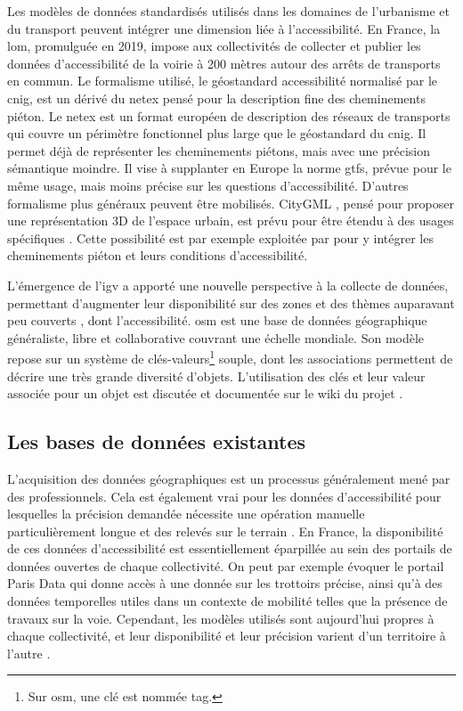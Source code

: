 Les modèles de données standardisés utilisés dans les domaines de l'urbanisme et du transport peuvent intégrer une dimension liée à l'accessibilité. En France, la \gls{lom}, promulguée en 2019, impose aux collectivités de collecter et publier les données d'accessibilité de la voirie à 200 mètres autour des arrêts de transports en commun. Le formalisme utilisé, le géostandard accessibilité normalisé par le \gls{cnig}, est un dérivé du \gls{netex} pensé pour la description fine des cheminements piéton. Le \gls{netex} est un format européen de description des réseaux de transports qui couvre un périmètre fonctionnel plus large que le géostandard du \gls{cnig}. Il permet déjà de représenter les cheminements piétons, mais avec une précision sémantique moindre. Il vise à supplanter en Europe la norme \gls{gtfs}, prévue pour le même usage, mais moins précise sur les questions d'accessibilité. D'autres formalisme plus généraux peuvent être mobilisés. CityGML \cite{Groeger2012}, pensé pour proposer une représentation 3D de l'espace urbain, est prévu pour être étendu à des usages spécifiques \cite{Biljecki2018}. Cette possibilité est par exemple exploitée par \cite{Wheeler2020} pour y intégrer les cheminements piéton et leurs conditions d'accessibilité.

L'émergence de l'\gls{igv} a apporté une nouvelle perspective à la collecte de données, permettant d'augmenter leur disponibilité sur des zones et des thèmes auparavant peu couverts \cite{Goodchild2007}, dont l'accessibilité. \gls{osm} est une base de données géographique généraliste, libre et collaborative couvrant une échelle mondiale. Son modèle repose sur un système de clés-valeurs\footnote{Sur \gls{osm}, une clé est nommée tag.} souple, dont les associations permettent de décrire une très grande diversité d'objets. L'utilisation des clés et leur valeur associée pour un objet est discutée et documentée sur le wiki du projet \cite{Ballatore2015}.

\subsection{Les bases de données existantes}


L'acquisition des données géographiques est un processus généralement mené par des professionnels. Cela est également vrai pour les données d'accessibilité pour lesquelles la précision demandée nécessite une opération manuelle particulièrement longue et des relevés sur le terrain \cite{Beale2006}. En France, la disponibilité de ces données d'accessibilité est essentiellement éparpillée au sein des portails de données ouvertes de chaque collectivité. On peut par exemple évoquer le portail Paris Data qui donne accès à une donnée sur les trottoirs précise, ainsi qu'à des données temporelles utiles dans un contexte de mobilité telles que la présence de travaux sur la voie. Cependant, les modèles utilisés sont aujourd'hui propres à chaque collectivité, et leur disponibilité et leur précision varient d'un territoire à l'autre \cite{Ding2014}.

